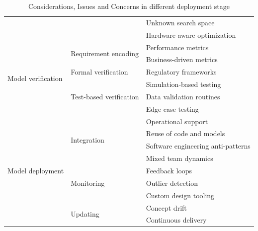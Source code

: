 \begin{table}[H]
\begin{tabular}{|l|l|l|}
                  &                                     &  Unknown search space\\ 
                  &                                     &  Hardware-aware optimization\\ \hline
\multirow{6}{*}{Model verification} & \multirow{2}{*}{Requirement encoding} & Performance metrics \\
                  &                                     & Business-driven metrics\\ \cline{2-3} 
                  &                 Formal verification &  Regulatory frameworks\\ \cline{2-3} 
                  & \multirow{3}{*}{Test-based verification} &  Simulation-based testing\\ 
                  &                                     &  Data validation routines\\ 
                  &                                     &  Edge case testing\\ \hline
\multirow{9}{*}{Model deployment} & \multirow{4}{*}{Integration} &  Operational support\\ 
                  &                   &  Reuse of code and models\\ 
                  &                   &  Software engineering anti-patterns\\ 
                  &                   &  Mixed team dynamics\\ \cline{2-3} 
                  & \multirow{3}{*}{Monitoring} & Feedback loops  \\ 
                  &                   &  Outlier detection\\
                  &                   &  Custom design tooling\\ \cline{2-3} 
                  & \multirow{2}{*}{Updating} & Concept drift  \\
                  &                   &  Continuous delivery\\ \hline
\end{tabular}
\caption{Considerations, Issues and Concerns in different deployment stage \cite{paleyes2022challenges}}
\label{tab:deployment_stages}
\end{table}


































